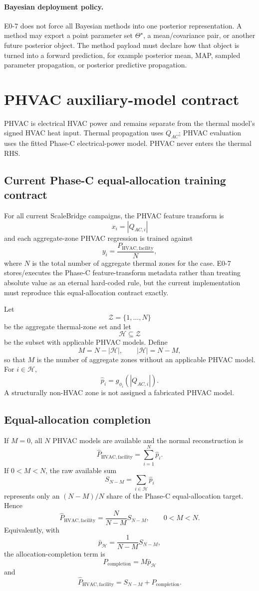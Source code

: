 \documentclass[11pt]{article}
\begin{document}
\paragraph{Bayesian deployment policy.}
E0-7 does not force all Bayesian methods into one posterior representation. A
method may export a point parameter set $\Theta^\star$, a mean/covariance pair,
or another future posterior object. The method payload must declare how that
object is turned into a forward prediction, for example posterior mean, MAP,
sampled parameter propagation, or posterior predictive propagation.

\section{PHVAC auxiliary-model contract}

PHVAC is electrical HVAC power and remains separate from the thermal model's
signed HVAC heat input. Thermal propagation uses $Q_{AC}$; PHVAC evaluation
uses the fitted Phase-C electrical-power model. PHVAC never enters the thermal
RHS.

\subsection{Current Phase-C equal-allocation training contract}
For all current ScaleBridge campaigns, the PHVAC feature transform is
\[
\boxed{x_i=|Q_{AC,i}|}
\]
and each aggregate-zone PHVAC regression is trained against
\[
\boxed{y_i=\frac{P_{\mathrm{HVAC,facility}}}{N}},
\]
where $N$ is the total number of aggregate thermal zones for the case. E0-7
stores/executes the Phase-C feature-transform metadata rather than treating
absolute value as an eternal hard-coded rule, but the current implementation
must reproduce this equal-allocation contract exactly.

Let
\[
\mathcal Z=\{1,\ldots,N\}
\]
be the aggregate thermal-zone set and let
\[
\mathcal H\subseteq\mathcal Z
\]
be the subset with applicable PHVAC models. Define
\[
M=N-|\mathcal H|,
\qquad |\mathcal H|=N-M,
\]
so that $M$ is the number of aggregate zones without an applicable PHVAC model.
For $i\in\mathcal H$,
\[
\hat p_i=g_{\phi_i}(|Q_{AC,i}|).
\]
A structurally non-HVAC zone is not assigned a fabricated PHVAC model.

\subsection{Equal-allocation completion}
If $M=0$, all $N$ PHVAC models are available and the normal reconstruction is
\[
\boxed{
\hat P_{\mathrm{HVAC,facility}}
=\sum_{i=1}^{N}\hat p_i.
}
\]
If $0<M<N$, the raw available sum
\[
S_{N-M}=\sum_{i\in\mathcal H}\hat p_i
\]
represents only an $(N-M)/N$ share of the Phase-C equal-allocation target. Hence
\[
\boxed{
\hat P_{\mathrm{HVAC,facility}}
=\frac{N}{N-M}S_{N-M},
\qquad 0<M<N.
}
\]
Equivalently, with
\[
\bar p_{\mathcal H}=\frac{1}{N-M}S_{N-M},
\]
the allocation-completion term is
\[
\boxed{
P_{\mathrm{completion}}
=M\bar p_{\mathcal H}
}
\]
and
\[
\hat P_{\mathrm{HVAC,facility}}
=S_{N-M}+P_{\mathrm{completion}}.
\]
\end{document}
